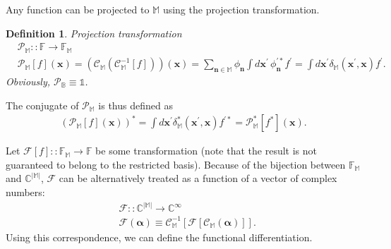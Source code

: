 \documentclass[12pt,aip,jmp,amssymb,amsmath]{revtex4-1}
\newcommand{\nvec}{\boldsymbol{n}}
\newcommand{\xvec}{\boldsymbol{x}}
\newcommand{\balpha}{\boldsymbol{\alpha}}
\newcommand{\fullbasis}{\mathbb{B}}
\newcommand{\restbasis}{\mathbb{M}}
\newtheorem{definition}{Definition}
\begin{document}
Any function can be projected to $\restbasis$ using the projection transformation.

\begin{definition}
\label{def:func-calculus:projector}
    Projection transformation
    \begin{equation*}\begin{split}
        & \mathcal{P}_{\restbasis} ::
        \mathbb{F} \rightarrow \mathbb{F}_{\restbasis} \\
        & \mathcal{P}_{\restbasis}[f](\xvec)
        = (\mathcal{C}_{\restbasis}(\mathcal{C}_{\restbasis}^{-1}[f])) (\xvec)
        = \sum_{\nvec \in \restbasis} \phi_{\nvec} \int
            d\xvec^\prime\, \phi_{\nvec}^{\prime*} f^\prime
        = \int d\xvec^\prime \delta_{\restbasis}(\xvec^\prime, \xvec) f^\prime.
    \end{split}\end{equation*}
    Obviously, $\mathcal{P}_{\fullbasis} \equiv \mathds{1}$.
\end{definition}

The conjugate of $\mathcal{P}_{\restbasis}$ is thus defined as
\begin{equation}\begin{split}
    (\mathcal{P}_{\restbasis}[f](\xvec))^*
    = \int d\xvec^\prime \delta_{\restbasis}^*(\xvec^\prime, \xvec) f^{\prime*}
    = \mathcal{P}_{\restbasis}^* [f^*](\xvec).
\end{split}\end{equation}

Let $\mathcal{F}[f] :: \mathbb{F}_{\restbasis} \rightarrow \mathbb{F}$ be some transformation (note that the result is not guaranteed to belong to the restricted basis).
Because of the bijection between $\mathbb{F}_{\restbasis}$ and $\mathbb{C}^{|\restbasis|}$, $\mathcal{F}$ can be alternatively treated as a function of a vector of complex numbers:
\begin{equation}\begin{split}
    & \mathcal{F} :: \mathbb{C}^{|\restbasis|} \rightarrow \mathbb{C}^\infty \\
    & \mathcal{F}(\balpha) \equiv \mathcal{C}_{\restbasis}^{-1}[\mathcal{F}[\mathcal{C}_{\restbasis}(\balpha)]].
\end{split}\end{equation}
Using this correspondence, we can define the functional differentiation.
\end{document}
